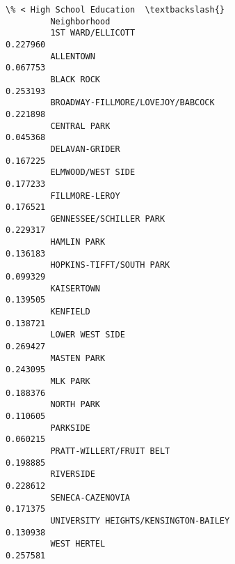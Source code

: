\documentclass[11pt]{article}
\begin{document}
\begin{Verbatim}[commandchars=\\\{\}]
                                               \% < High School Education  \textbackslash{}
         Neighborhood                                                      
         1ST WARD/ELLICOTT                                      0.227960   
         ALLENTOWN                                              0.067753   
         BLACK ROCK                                             0.253193   
         BROADWAY-FILLMORE/LOVEJOY/BABCOCK                      0.221898   
         CENTRAL PARK                                           0.045368   
         DELAVAN-GRIDER                                         0.167225   
         ELMWOOD/WEST SIDE                                      0.177233   
         FILLMORE-LEROY                                         0.176521   
         GENNESSEE/SCHILLER PARK                                0.229317   
         HAMLIN PARK                                            0.136183   
         HOPKINS-TIFFT/SOUTH PARK                               0.099329   
         KAISERTOWN                                             0.139505   
         KENFIELD                                               0.138721   
         LOWER WEST SIDE                                        0.269427   
         MASTEN PARK                                            0.243095   
         MLK PARK                                               0.188376   
         NORTH PARK                                             0.110605   
         PARKSIDE                                               0.060215   
         PRATT-WILLERT/FRUIT BELT                               0.198885   
         RIVERSIDE                                              0.228612   
         SENECA-CAZENOVIA                                       0.171375   
         UNIVERSITY HEIGHTS/KENSINGTON-BAILEY                   0.130938   
         WEST HERTEL                                            0.257581   
         

\end{Verbatim}
\end{document}
